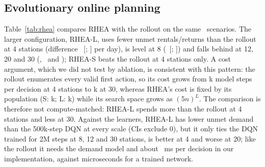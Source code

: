 \documentclass[conference,a4paper]{IEEEtran}
\begin{document}
\subsection{Evolutionary online planning}
Table~\ref{tab:rhea} compares RHEA with the rollout on the same \cecN\ scenarios. The larger configuration, RHEA-L, uses fewer unmet rentals/returns than the rollout at 4
stations (difference \cecRhLDeltaA\ [\cecRhLLoA; \cecRhLHiA] per day), is level at 8 (\cecRhLDeltaB\ [\cecRhLLoB; \cecRhLHiB]) and falls behind at 12, 20 and 30
(\cecRhLDeltaC, \cecRhLDeltaD\ and \cecRhLDeltaE); RHEA-S beats the rollout at 4 stations only. A cost argument, which we did not test by ablation, is consistent
with this pattern: the rollout enumerates every valid first action, so its cost grows from \cecCostRollA{}k model steps per decision at 4 stations to \cecCostRollE{}k at
30, whereas RHEA's cost is fixed by its population (S: \cecCostRheaSA{}k; L: \cecCostRheaLA{}k) while its search space grows as $(5n)^L$. The comparison is therefore not
compute-matched: RHEA-L spends more than the rollout at 4 stations and less at 30. Against the learners, RHEA-L has lower unmet demand than the 500k-step DQN at every
scale (CIs exclude 0), but it only ties the DQN trained for 2M steps at 8, 12 and 30 stations, is better at 4 and worse at 20; like the rollout it needs the demand model
and about \cecMsRheaLC\ ms per decision in our implementation, against microseconds for a trained network.

\begin{table}[t]
\centering\scriptsize\setlength{\tabcolsep}{4pt}
\caption{RHEA minus rollout, unmet demand per day on the same \cecN\ scenarios (paired; 95\% bootstrap CI over scenarios); negative: RHEA better. Cost: simulator
steps of the demand model per decision (thousands), counted exactly on one test scenario (rollout: $h=3$, $K=64$; the rollout's cost grows with the number of valid
actions, RHEA's is fixed by its population).}
\label{tab:rhea}

\end{table}
\end{document}
